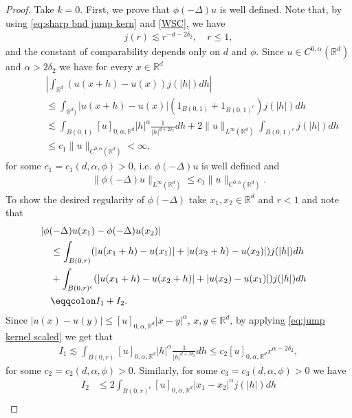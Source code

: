 \documentclass[12pt,a4paper,onecolumn]{amsart}
\theoremstyle{definition}
\newcommand{\R}{\mathbb{R}}
\newcommand{\1}{\mathbf 1}
\newcommand{\LoR}{\phi(-\Delta)}
\numberwithin{equation}{section}
\begin{document}
\begin{proof}
	Take $k=0$. First, we prove that $\LoR u$ is well defined. Note that, by using \eqref{eq:sharp bnd jump kern} and \ref{WSC}, we have 
    \begin{align}\label{eq:jump kernel scaled}
        j(r)\lesssim r^{-d-2\delta_2}, \quad r\le1,    
    \end{align}
    and the constant of comparability depends only on $d$ and $\phi$.
    Since $u\in C^{0,\alpha}(\R^d)$ and  $\alpha>2\delta_2$ we have for every $x\in\R^d$
    \begin{align*}
        &\left|\int_{\R^d}(u(x+h)-u(x))j(|h|)dh \right|\\
        \qquad&\le \int_{\R^d)}|u(x+h)-u(x)|\left(1_{B(0,1)}+1_{B(0,1)^c}\right)j(|h|)dh\\
        \qquad&\lesssim \int_{B(0,1)}[u]_{0,\alpha,\R^d}|h|^{\alpha}\frac{1}{|h|^{d+2\delta_2}}dh+2\|u\|_{L^\infty(\R^d)}\int_{B(0,1)^c}j(|h|)dh\\
        \qquad&\le c_1 \|u\|_{C^{0,\alpha}(\R^d)}<\infty,
    \end{align*}
    for some $c_1=c_1(d,\alpha,\phi)>0$, i.e. $\LoR u$ is well defined and 
    \begin{align}\label{eq:LoR bounded}
        \|\LoR u\|_{L^\infty(\R^d)}\le  c_1\|u\|_{C^{0,\alpha}(\R^d)}.    
    \end{align}
To show the desired regularity of $\LoR$ take $x_1,x_2\in\R^d$ and $r<1$ and note that
    \begin{align*}
        &\hspace{-1em}|\LoR u(x_1)-\LoR u(x_2)|
        \\&\le \int_{B(0,r)}(|u(x_1+h)-u(x_1)|+|u(x_2+h)-u(x_2)|)j(|h|)dh\\
        &+\int_{B(0,r)^c}(|u(x_1+h)-u(x_2+h)|+|u(x_2)-u(x_1)|)j(|h|)dh\\
        &\eqqcolon I_1+I_2.
    \end{align*}
    Since $|u(x)-u(y)|\le [u]_{0,\alpha,\R^d}|x-y|^\alpha$, $x,y\in\R^d$, by applying \eqref{eq:jump kernel scaled} we get that
    \begin{align}\label{eq:regularity I1 bound}
        I_1\lesssim \int_{B(0,r)}[u]_{0,\alpha,\R^d}|h|^{\alpha}\frac{1}{|h|^{d+2\delta_2}}dh\le c_2 [u]_{0,\alpha,\R^d}r^{\alpha-2\delta_2},
    \end{align}
    for some $c_2=c_2(d,\alpha,\phi)>0$. Similarly, for some  $c_3=c_3(d,\alpha,\phi)>0$ we have
    \begin{align}
        I_2&\le2 \int_{B(0,r)^c}[u]_{0,\alpha,\R^d}|x_1-x_2|^\alpha j(|h|)dh\nonumber\\

\end{align}
\end{proof}
\end{document}
